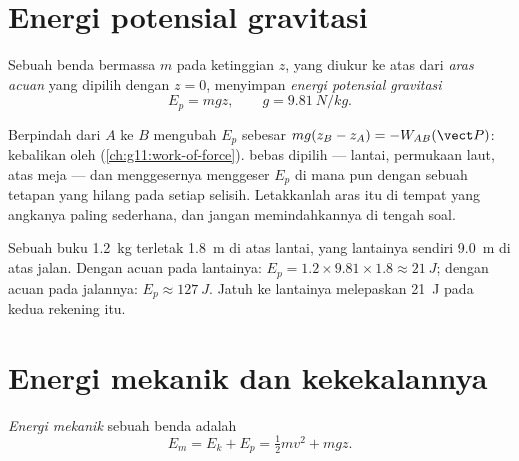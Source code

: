 \section{Energi potensial gravitasi}

\begin{definition}\label{def:g11:mechanical-energy:potential}
Sebuah benda bermassa $m$ pada ketinggian $z$, yang diukur ke atas dari
\emph{aras acuan} yang dipilih dengan $z = 0$,
menyimpan \emph{energi potensial gravitasi}
\[
E_p = m g z, \qquad g = \qty{9.81}{N/kg}.
\]
\end{definition}

\begin{remark}\label{rem:g11:mechanical-energy:reference}
Berpindah dari $A$ ke $B$ mengubah $E_p$ sebesar
$mg(z_B - z_A) =
-W_{AB}(\vect P)$: kebalikan  oleh 
(\cref{ch:g11:work-of-force}).  bebas dipilih --- lantai,
permukaan laut, atas meja --- dan menggesernya menggeser $E_p$ di mana
pun dengan sebuah tetapan yang hilang pada setiap selisih. Letakkanlah
aras itu di tempat yang angkanya paling sederhana, dan jangan
memindahkannya di tengah soal.
\end{remark}

\begin{example}\label{ex:g11:mechanical-energy:shelf}
Sebuah buku \qty{1.2}{kg} terletak \qty{1.8}{m} di atas lantai, yang
lantainya sendiri \qty{9.0}{m} di atas jalan. Dengan acuan pada
lantainya: $E_p = 1.2 \times 9.81 \times 1.8 \approx \qty{21}{J}$;
dengan acuan pada jalannya: $E_p \approx \qty{127}{J}$. Jatuh ke
lantainya melepaskan \qty{21}{J} pada kedua rekening itu.
\end{example}

\section{Energi mekanik dan kekekalannya}

\begin{definition}\label{def:g11:mechanical-energy:em}
\emph{Energi mekanik} sebuah benda adalah
\[
E_m = E_k + E_p = \tfrac12 m v^2 + m g z .
\]
\end{definition}

